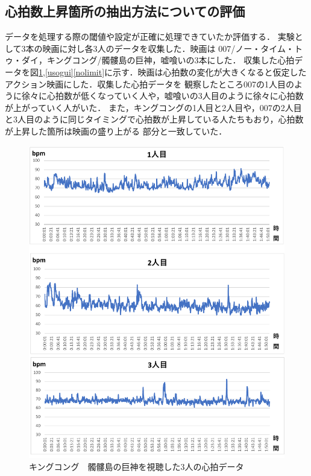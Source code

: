 \subsection{心拍数上昇箇所の抽出方法についての評価}
データを処理する際の閾値や設定が正確に処理できていたか評価する．
実験として3本の映画に対し各3人のデータを収集した．映画は 007/ノー・タイム・トゥ・ダイ，キングコング/髑髏島の巨神，嘘喰いの3本にした．
収集した心拍データを図\ref{king},\ref{usogui}\ref{nolimit}に示す．映画は心拍数の変化が大きくなると仮定したアクション映画にした．収集した心拍データを
観察したところ007の1人目のように徐々に心拍数が低くなっていく人や，嘘喰いの3人目のように徐々に心拍数が上がっていく人がいた．
また，キングコングの1人目と2人目や，007の2人目と3人目のように同じタイミングで心拍数が上昇している人たちもおり，心拍数が上昇した箇所は映画の盛り上がる
部分と一致していた．
\begin{figure}[H]
    \centering
    \includegraphics[width=14cm]{images/chapter4/kingkong2.pdf}
    \caption{キングコング　髑髏島の巨神を視聴した3人の心拍データ}
    \label{king}
\end{figure}
